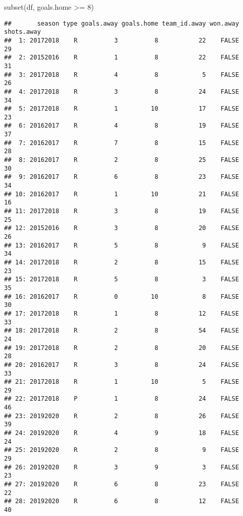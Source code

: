 \documentclass[
]{article}
\newenvironment{Shaded}{\begin{snugshade}}{\end{snugshade}}
\newcommand{\DecValTok}[1]{\textcolor[rgb]{0.00,0.00,0.81}{#1}}
\newcommand{\FunctionTok}[1]{\textcolor[rgb]{0.00,0.00,0.00}{#1}}
\newcommand{\NormalTok}[1]{#1}
\newcommand{\SpecialCharTok}[1]{\textcolor[rgb]{0.00,0.00,0.00}{#1}}
\begin{document}
\begin{Shaded}
\begin{Highlighting}[]
\FunctionTok{subset}\NormalTok{(df, goals.home }\SpecialCharTok{\textgreater{}=} \DecValTok{8}\NormalTok{)}
\end{Highlighting}
\end{Shaded}

\begin{verbatim}
##       season type goals.away goals.home team_id.away won.away shots.away
##  1: 20172018    R          3          8           22    FALSE         29
##  2: 20152016    R          1          8           22    FALSE         31
##  3: 20172018    R          4          8            5    FALSE         26
##  4: 20172018    R          3          8           24    FALSE         34
##  5: 20172018    R          1         10           17    FALSE         23
##  6: 20162017    R          4          8           19    FALSE         37
##  7: 20162017    R          7          8           15    FALSE         28
##  8: 20162017    R          2          8           25    FALSE         30
##  9: 20162017    R          6          8           23    FALSE         34
## 10: 20162017    R          1         10           21    FALSE         16
## 11: 20172018    R          3          8           19    FALSE         25
## 12: 20152016    R          3          8           20    FALSE         26
## 13: 20162017    R          5          8            9    FALSE         34
## 14: 20172018    R          2          8           15    FALSE         23
## 15: 20172018    R          5          8            3    FALSE         35
## 16: 20162017    R          0         10            8    FALSE         30
## 17: 20172018    R          1          8           12    FALSE         33
## 18: 20172018    R          2          8           54    FALSE         24
## 19: 20172018    R          2          8           20    FALSE         28
## 20: 20162017    R          3          8           24    FALSE         33
## 21: 20172018    R          1         10            5    FALSE         29
## 22: 20172018    P          1          8           24    FALSE         46
## 23: 20192020    R          2          8           26    FALSE         39
## 24: 20192020    R          4          9           18    FALSE         24
## 25: 20192020    R          2          8            9    FALSE         29
## 26: 20192020    R          3          9            3    FALSE         23
## 27: 20192020    R          6          8           23    FALSE         22
## 28: 20192020    R          6          8           12    FALSE         40

\end{verbatim}
\end{document}
